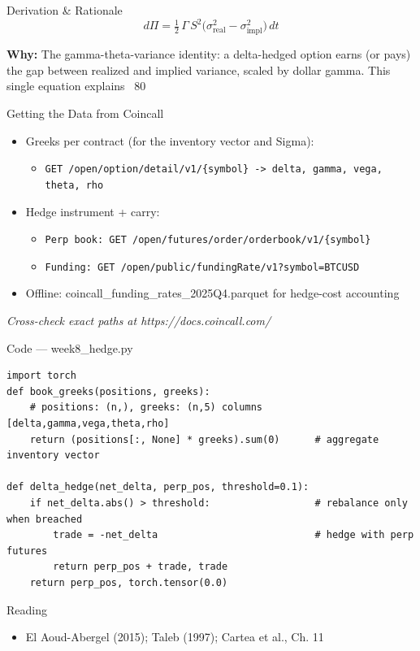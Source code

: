 \documentclass[aspectratio=169,10pt]{beamer}
\begin{document}
\begin{frame}{Derivation \& Rationale}
\[d\Pi = \tfrac12\,\Gamma\,S^2\big(\sigma_{\text{real}}^2-\sigma_{\text{impl}}^2\big)\,dt\]

\small\textbf{\color{ncsured}Why:} The gamma-theta-variance identity: a delta-hedged option earns (or pays) the gap between realized and implied variance, scaled by dollar gamma. This single equation explains ~80%
\end{frame}

\begin{frame}{Getting the Data from Coincall}
\begin{itemize}
  \item Greeks per contract (for the inventory vector and Sigma):
  \begin{itemize}\item \texttt{\small GET /open/option/detail/v1/\{symbol\}  -\textgreater{} delta, gamma, vega, theta, rho}\end{itemize}
  \item Hedge instrument + carry:
  \begin{itemize}\item \texttt{\small Perp book:  GET /open/futures/order/orderbook/v1/\{symbol\}}\end{itemize}
  \begin{itemize}\item \texttt{\small Funding:    GET /open/public/fundingRate/v1?symbol=BTCUSD}\end{itemize}
  \item Offline: coincall\_funding\_rates\_2025Q4.parquet for hedge-cost accounting
\end{itemize}
\vspace{2pt}\tiny\textit{Cross-check exact paths at https://docs.coincall.com/}
\end{frame}

\begin{frame}[fragile]{Code --- week8\_hedge.py}
\begin{lstlisting}
import torch
def book_greeks(positions, greeks):
    # positions: (n,), greeks: (n,5) columns [delta,gamma,vega,theta,rho]
    return (positions[:, None] * greeks).sum(0)      # aggregate inventory vector

def delta_hedge(net_delta, perp_pos, threshold=0.1):
    if net_delta.abs() > threshold:                  # rebalance only when breached
        trade = -net_delta                           # hedge with perp futures
        return perp_pos + trade, trade
    return perp_pos, torch.tensor(0.0)
\end{lstlisting}
\end{frame}
\begin{frame}{Reading}
\begin{itemize}
  \item El Aoud-Abergel (2015); Taleb (1997); Cartea et al., Ch. 11
\end{itemize}
\end{frame}
\end{document}
